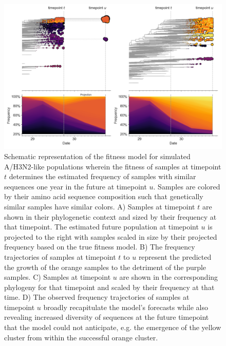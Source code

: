 \begin{figure}[ht]
  \begin{center}
  \includegraphics[width=\columnwidth]{figures/distance-based-fitness-model.png}
  \caption{
    Schematic representation of the fitness model for simulated A/H3N2-like populations wherein the fitness of samples at timepoint $t$ determines the estimated frequency of samples with similar sequences one year in the future at timepoint $u$.
    Samples are colored by their amino acid sequence composition such that genetically similar samples have similar colors.
    A) Samples at timepoint $t$ are shown in their phylogenetic context and sized by their frequency at that timepoint.
    The estimated future population at timepoint $u$ is projected to the right with samples scaled in size by their projected frequency based on the true fitness model.
    B) The frequency trajectories of samples at timepoint $t$ to $u$ represent the predicted the growth of the orange samples to the detriment of the purple samples.
    C) Samples at timepoint $u$ are shown in the corresponding phylogeny for that timepoint and scaled by their frequency at that time.
    D) The observed frequency trajectories of samples at timepoint $u$ broadly recapitulate the model's forecasts while also revealing increased diversity of sequences at the future timepoint that the model could not anticipate, e.g. the emergence of the yellow cluster from within the successful orange cluster.
  }
  \label{fig:model}
  \end{center}
\end{figure}


